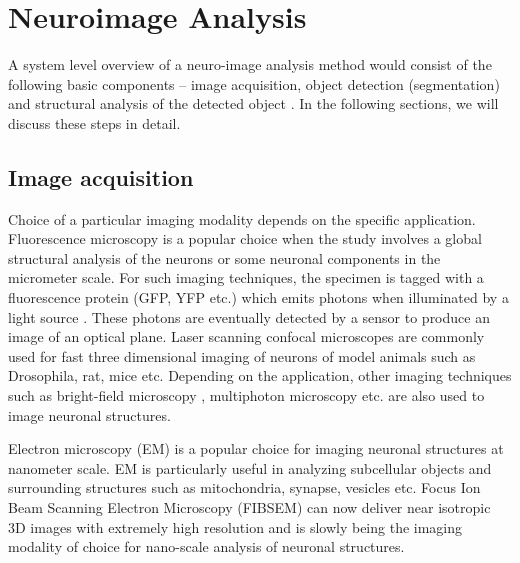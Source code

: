 \section{Neuroimage Analysis}
A system level overview of a neuro-image analysis method would consist of the following basic components – image acquisition, object detection (segmentation) and structural analysis of the detected object \cite{meijering_survey}. In the following sections, we will discuss these steps in detail.

\subsection{Image acquisition}
Choice of a particular imaging modality depends on the specific application. Fluorescence microscopy is a popular choice when the study involves a global structural analysis of the neurons or some neuronal components in the micrometer scale. For such imaging techniques, the specimen is tagged with a fluorescence protein (GFP, YFP etc.) which emits photons when illuminated by a light source \cite{barry_branching}. These photons are eventually detected by a sensor to produce an image of an optical plane. Laser scanning confocal microscopes are commonly used for fast three dimensional imaging of neurons of model animals such as Drosophila, rat, mice etc. Depending on the application, other imaging techniques such as bright-field microscopy \cite{oberlaender2007transmitted}, multiphoton microscopy \cite{santamaria2007automatic} etc. are also used to image neuronal structures.   

Electron microscopy (EM) is a popular choice for imaging neuronal structures at nanometer scale. EM is particularly useful in analyzing subcellular objects and surrounding structures such as mitochondria, synapse, vesicles etc. Focus Ion Beam Scanning Electron Microscopy (FIBSEM) \cite{kreshuk2011automated} can now deliver near isotropic 3D images with extremely high resolution and is slowly being the imaging modality of choice for nano-scale analysis of neuronal structures. 

